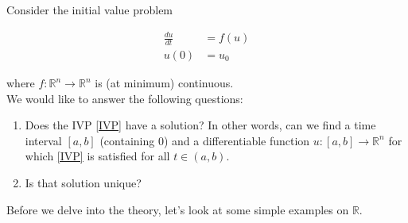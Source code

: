 \documentclass{article}
\newcounter{question}
\def\R{{\mathbb R}}
\begin{document}
Consider the initial value problem

\begin{align}\label{IVP}
\frac{du}{dt} &= f(u) \\
u(0) &= u_0 \nonumber
\end{align}

where $f: \R^n \rightarrow \R^n$ is (at minimum) continuous.\\

We would like to answer the following questions:
\begin{enumerate}
	\item Does the IVP \eqref{IVP} have a solution? In other words, can we find a time interval $[a, b]$ (containing 0) and a differentiable function $u: [a, b] \rightarrow \R^n$ for which \eqref{IVP} is satisfied for all $t \in (a, b)$.
	\item Is that solution unique?
\end{enumerate}

Before we delve into the theory, let's look at some simple examples on $\R$.
\end{document}
